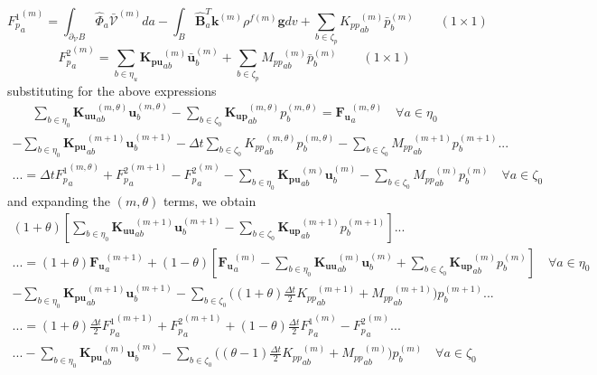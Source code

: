 \documentclass[11pt]{article} %
\begin{document}
\begin{equation}
	{F^1_{p}}_{a}^{(m)} = \int_{\partial_{\mathcal{V}} B} \hat{\Phi}_a \bar{\mathcal{V}}^{(m)} da - \int_B \hat{\mathbf{B}}_a^T \mathbf{k}^{(m)} \rho^{f (m)} \mathbf{g} dv + \sum_{b \in \zeta_p} {K_{pp}}_{ab}^{(m)} \bar{p}_b^{(m)} \qquad ( 1 \times 1 )
\end{equation}
\begin{equation}
	{F^2_{p}}_{a}^{(m)} = \sum_{b \in \eta_u} \mathbf{K_{pu}}_{ab}^{(m)} \bar{\mathbf{u}}_b^{(m)} + \sum_{b \in \zeta_p} {M_{pp}}_{ab}^{(m)} \bar{p}_b^{(m)} \qquad ( 1 \times 1 )
	\label{eq:Fp2}
\end{equation}
substituting for the above expressions
\begin{eqnarray}
	 \sum_{b \in \eta_0} \mathbf{K_{uu}}_{ab}^{(m,\theta)} \mathbf{u}_b^{(m,\theta)} - \sum_{b \in \zeta_0} \mathbf{K_{up}}_{ab}^{(m,\theta)} p_b^{(m,\theta)} = \mathbf{F_{u}}_{a}^{(m,\theta)} \quad \forall a \in \eta_0
\end{eqnarray}
\begin{eqnarray}
	 - \sum_{b \in \eta_0} \mathbf{K_{pu}}_{ab}^{(m+1)} \mathbf{u}_b^{(m+1)} - \Delta t \sum_{b \in \zeta_0} {K_{pp}}_{ab}^{(m, \theta)} p_b^{(m,\theta)} - \sum_{b \in \zeta_0} {M_{pp}}_{ab}^{(m+1)} p_b^{(m+1)}  ... \nonumber \\
	... = \Delta t {F^1_{p}}_{a}^{(m,\theta)} + {F^2_{p}}_{a}^{(m+1)} - {F^2_{p}}_{a}^{(m)} - \sum_{b \in \eta_0} \mathbf{K_{pu}}_{ab}^{(m)} \mathbf{u}_b^{(m)} - \sum_{b \in \zeta_0} {M_{pp}}_{ab}^{(m)} p_b^{(m)} \quad \forall a \in \zeta_0
\end{eqnarray}
and expanding the $(m,\theta)$ terms, we obtain
\begin{eqnarray}
	(1+\theta) \left[ \sum_{b \in \eta_0} \mathbf{K_{uu}}_{ab}^{(m+1)} \mathbf{u}_b^{(m+1)} - \sum_{b \in \zeta_0} \mathbf{K_{up}}_{ab}^{(m+1)} p_b^{(m+1)} \right] ... \qquad \qquad \nonumber \\
	... = (1+\theta) \mathbf{F_{u}}_{a}^{(m+1)} + (1-\theta) \left[ \mathbf{F_{u}}_{a}^{(m)} - \sum_{b \in \eta_0} \mathbf{K_{uu}}_{ab}^{(m)} \mathbf{u}_b^{(m)} + \sum_{b \in \zeta_0} \mathbf{K_{up}}_{ab}^{(m)} p_b^{(m)} \right] \quad \forall a \in \eta_0
\end{eqnarray}
\newline
\begin{eqnarray}
	 - \sum_{b \in \eta_0} \mathbf{K_{pu}}_{ab}^{(m+1)} \mathbf{u}_b^{(m+1)} - \sum_{b \in \zeta_0} \bigg( (1+\theta) \frac{\Delta t}{2} {K_{pp}}_{ab}^{(m+1)} + {M_{pp}}_{ab}^{(m+1)} \bigg) p_b^{(m+1)}  ... \nonumber \\
	... = (1+\theta) \frac{\Delta t}{2} {F^1_{p}}_{a}^{(m+1)} + {F^2_{p}}_{a}^{(m+1)} + (1-\theta) \frac{\Delta t}{2} {F^1_{p}}_{a}^{(m)} - {F^2_{p}}_{a}^{(m)} ... \nonumber \\
	... - \sum_{b \in \eta_0} \mathbf{K_{pu}}_{ab}^{(m)} \mathbf{u}_b^{(m)} - \sum_{b \in \zeta_0} \bigg( (\theta-1) \frac{\Delta t}{2} {K_{pp}}_{ab}^{(m)} + {M_{pp}}_{ab}^{(m)} \bigg) p_b^{(m)} \quad \forall a \in \zeta_0
\end{eqnarray}
\end{document}
